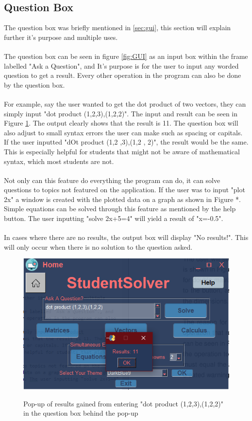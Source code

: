\documentclass[final]{cmpreport}
\begin{document}
	\subsection{Question Box} \label{sec:question}
	
	The question box was briefly mentioned in \ref{sec:gui}, this section will explain further it's purpose and multiple uses.\\
	\\The question box can be seen in figure \ref{fig:GUI} as an input box within the frame labelled "Ask a Question", and It's purpose is for the user to input any worded question to get a result. Every other operation in the program can also be done by the question box.\\
	\\For example, say the user wanted to get the dot product of two vectors, they can simply input "dot product (1,2,3),(1,2,2)". The input and result can be seen in Figure \ref{fig:question}. The output clearly shows that the result is 11. The question box will also adjust to small syntax errors the user can make such as spacing or capitals. If the user inputted "dOt product   (1,2  ,3),(1,2 , 2)", the result would be the same. This is especially helpful for students that might not be aware of mathematical syntax, which most students are not.\\
	\\Not only can this feature do everything the program can do, it can solve questions to topics not featured on the application. If the user was to input "plot 2x" a window is created with the plotted data on a graph as shown in Figure *. Simple equations can be solved through this feature as mentioned by the help button. The user inputting "solve 2x+5=4" will yield a result of "x=-0.5".\\
	\\In cases where there are no results, the output box will display "No results!". This will only occur when there is no solution to the question asked.  
	
		\begin{figure}[H]
		\caption{Pop-up of results gained from entering "dot product (1,2,3),(1,2,2)" in the question box behind the pop-up}
		\centering
		\includegraphics[scale=1]{question.png}
		\label{fig:question}
	\end{figure}
	
\end{document}
